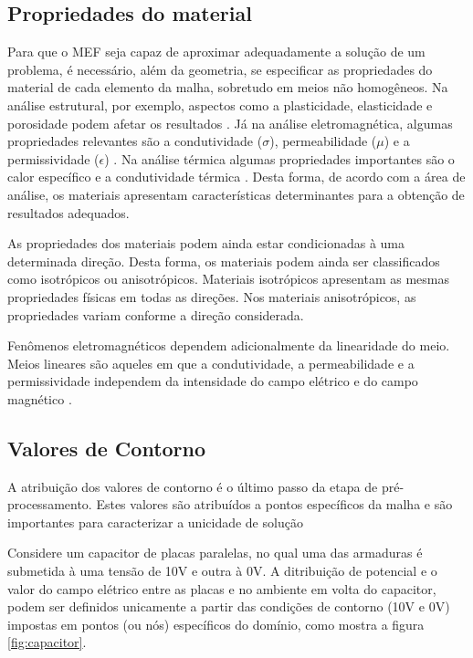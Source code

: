 \documentclass[
    12pt,               %
    openright,          %
    oneside,
    a4paper,            %
    english,            %
    french,             %
    spanish,            %
    brazil              %
    ]{abntex2}
\begin{document}
\subsection{Propriedades do material}
Para que o MEF seja capaz de aproximar adequadamente a solução de um problema, é necessário, além da geometria, se especificar as propriedades do material de cada elemento da malha, sobretudo em meios não homogêneos. Na análise estrutural, por exemplo, aspectos como a plasticidade, elasticidade e porosidade podem afetar os resultados \cite[p. 250]{desai}. Já na análise eletromagnética, algumas propriedades relevantes são a condutividade ($\sigma$), permeabilidade ($\mu$) e a permissividade ($\epsilon$) \cite[p. 3]{volakis}. Na análise térmica algumas propriedades importantes são o calor específico e a condutividade térmica \cite[p. 251]{desai}.
Desta forma, de acordo com a área de análise, os materiais apresentam características determinantes para a obtenção de resultados adequados.

As propriedades dos materiais podem ainda estar condicionadas à uma determinada direção. Desta forma, os materiais podem ainda ser classificados como isotrópicos ou anisotrópicos\cite[p. 20]{sadiku}.  Materiais isotrópicos apresentam as mesmas propriedades físicas em todas as direções. Nos materiais anisotrópicos, as propriedades variam conforme a direção considerada.

Fenômenos eletromagnéticos dependem adicionalmente da linearidade do meio. Meios lineares são aqueles em que a condutividade, a permeabilidade e a permissividade independem da intensidade do campo elétrico e do campo magnético \cite[p. 20]{sadiku} .


\subsection{Valores de Contorno}
A atribuição dos valores de contorno é o último passo da etapa de pré- processamento. Estes valores são atribuídos a pontos específicos da malha e são importantes para caracterizar a unicidade de solução \cite[p. 7]{zien}

Considere um capacitor de placas paralelas, no qual uma das armaduras é submetida à uma tensão de 10V e outra à 0V. A ditribuição de potencial e o valor do campo elétrico entre as placas e no ambiente em volta do capacitor, podem ser definidos unicamente a partir das condições de contorno (10V e 0V) impostas em pontos (ou nós) específicos do domínio, como mostra a figura \ref{fig:capacitor}.
\end{document}
